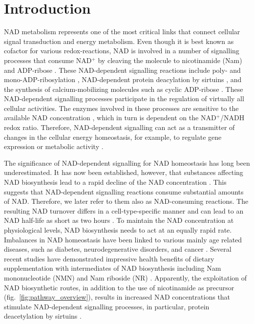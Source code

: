 
\section{Introduction}

NAD metabolism represents one of the most critical links that connect cellular signal transduction and energy metabolism. Even though it is best known as cofactor for various redox-reactions, NAD is involved in a number of signalling processes that consume NAD$^{+}$ by cleaving the molecule to nicotinamide (Nam) and ADP-ribose \citep{Verdin2015}. These NAD-dependent signalling reactions include poly- and mono-ADP-ribosylation \citep{Butepage2015,DeVos2012}, NAD-dependent protein deacylation by sirtuins \citep{Osborne2016}, and the synthesis of calcium-mobilizing molecules such as cyclic ADP-ribose \citep{Lee2012}. These NAD-dependent signalling processes participate in the regulation of virtually all cellular activities. The enzymes involved in these processes are sensitive to the available NAD concentration \citep{Ruggieri2015}, which in turn is dependent on the NAD$^{+}$/NADH redox ratio. Therefore, NAD-dependent signalling can act as a transmitter of changes in the cellular energy homeostasis, for example, to regulate gene expression or metabolic activity \citep{Koch-Nolte2009}.

The significance of NAD-dependent signalling for NAD homeostasis has long been underestimated. It has now been established, however, that substances affecting NAD biosynthesis lead to a rapid decline of the NAD concentration \citep{Buonvicino2018}. This suggests that NAD-dependent signalling reactions consume substantial amounts of NAD. Therefore, we later refer to them also as NAD-consuming reactions. The resulting NAD turnover differs in a cell-type-specific manner and can lead to an NAD half-life as short as two hours \citep{Liu2018}. To maintain the NAD concentration at physiological levels, NAD biosynthesis needs to act at an equally rapid rate. Imbalances in NAD homeostasis have been linked to various mainly age related diseases, such as diabetes, neurodegenerative disorders, and cancer \citep{Chiarugi2012,Verdin2015}. Several recent studies have demonstrated impressive health benefits of dietary supplementation with intermediates of NAD biosynthesis including Nam mononucleotide (NMN) and Nam riboside (NR) \citep{Yoshino2018}. Apparently, the exploitation of NAD biosynthetic routes, in addition to the use of nicotinamide as precursor (fig.~\ref{fig:pathway_overview}), results in increased NAD concentrations that stimulate NAD-dependent signalling processes, in particular, protein deacetylation by sirtuins \citep{North2004}.

